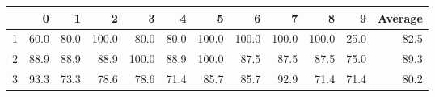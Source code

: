 \begin{tabular}{lrrrrrrrrrrr}
\toprule
{} &     0 &     1 &      2 &      3 &     4 &      5 &      6 &      7 &      8 &     9 &  Average \\
\midrule
1 &  60.0 &  80.0 &  100.0 &   80.0 &  80.0 &  100.0 &  100.0 &  100.0 &  100.0 &  25.0 &     82.5 \\
2 &  88.9 &  88.9 &   88.9 &  100.0 &  88.9 &  100.0 &   87.5 &   87.5 &   87.5 &  75.0 &     89.3 \\
3 &  93.3 &  73.3 &   78.6 &   78.6 &  71.4 &   85.7 &   85.7 &   92.9 &   71.4 &  71.4 &     80.2 \\
\bottomrule
\end{tabular}
